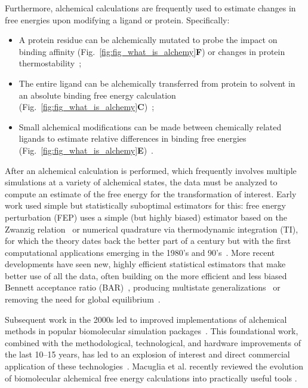 \documentclass[9pt,bestpractices]{livecoms}
\begin{document}
Furthermore, alchemical calculations are frequently used to estimate changes in free energies upon modifying a ligand or protein. Specifically:
\begin{itemize}
\item A protein residue can be alchemically mutated to probe the impact on binding affinity (Fig.~\ref{fig:fig_what_is_alchemy}\textbf{F})\cite{hauser2018predicting,aldeghi2018accurate} or changes in protein thermostability~\cite{seeliger2010protein,gapsys2016insights,gapsys2016accurate,aldeghi2019accurate}; 
\item The entire ligand can be alchemically transferred from protein to solvent in an absolute binding free energy calculation (Fig.~\ref{fig:fig_what_is_alchemy}\textbf{C})~\cite{mobley2007predicting,aldeghi2015accurate,aldeghi2017predictions}; 
\item Small alchemical modifications can be made between chemically related ligands to estimate relative differences in binding free energies (Fig.~\ref{fig:fig_what_is_alchemy}\textbf{E})~\cite{wang2015accurate,mey2016blinded,song2019using,gapsys2020large,kuhn2020assessment}.
\end{itemize}


After an alchemical calculation is performed, which frequently involves multiple simulations at a variety of alchemical states, the data must be analyzed to compute an estimate of the free energy for the transformation of interest.
Early work used simple but statistically suboptimal estimators for this: free energy perturbation (FEP) uses a simple (but highly biased) estimator based on the Zwanzig relation~\cite{zwanzig1954hightemperature} or numerical quadrature via thermodynamic integration (TI), for which the theory dates back the better part of a century but with the first computational applications emerging in the 1980's and 90's~\cite{kirkwood1935statistical, jorgensen1985monte, kollman1993free, wong1986dynamics, merz1989free}. %
More recent developments have seen new, highly efficient statistical estimators that make better use of all the data, often building on the more efficient and less biased Bennett acceptance ratio (BAR)~\cite{bennett1976efficient}, producing multistate generalizations~\cite{shirts2008statisticallya} or removing the need for global equilibrium~\cite{wu2016multiensemble, mey2014xtram, wu2014statistically}.

Subsequent work in the 2000s led to improved implementations of alchemical methods in popular biomolecular simulation packages~\cite{shirts2003extremely,shirts2005solvation,vanderspoel2005gromacs, mermelstein2018fast, wang2015accurate, hedges2019biosimspace, riniker2011calculation}. 
This foundational work, combined with the methodological, technological, and hardware improvements of the last 10--15 years, has led to an explosion of interest and direct commercial application of these technologies~\cite{wang2015accurate, fratev2019improved, schindler2020largescale, cournia2017relative, sherborne2016collaborating, kuhn2020assessment}. Macuglia et al. recently reviewed the evolution of biomolecular alchemical free energy calculations into practically useful tools \cite{macuglia2025dawn}.
\end{document}
